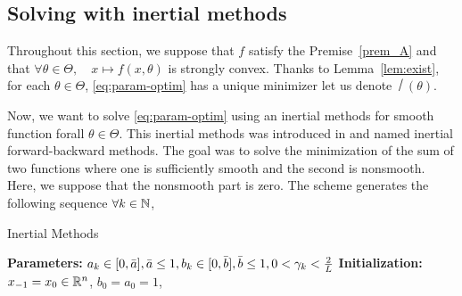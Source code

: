 \subsection{Solving with inertial methods}\label{subsec:solv-im}



Throughout this section, we suppose that $f$ satisfy the Premise~\ref{prem_A} and that $\forall \theta\in\Theta,\quad x\mapsto f(x,\theta)$ is strongly convex. Thanks to Lemma~\ref{lem:exist}, for each $\theta\in\Theta$, \eqref{eq:param-optim} has a unique minimizer let us denote $\xsol(\theta)$. 
 
 Now, we want to solve \eqref{eq:param-optim} using an  inertial  methods  for smooth function  forall $\theta\in\Theta.$  
 This inertial methods was introduced in \cite{liang_activity_2017} and named inertial forward-backward methods. The goal was to solve the minimization of the sum of two functions where one is sufficiently smooth and the second is nonsmooth. Here, we suppose that the nonsmooth part is zero.
 The scheme generates the following sequence $\forall k\in\mathbb{N}$,
 \begin{algorithm}[htbp]
	\caption{ Inertial Methods}
	\label{eq:inertial-methods}
	\textbf{Parameters:}  $a_{k}\in[0,\bar{a}], \bar{a}\leq1,  b_{k}\in[0,\bar{b}], \bar{b}\leq1,0<\gamma_{k}<\frac{2}{L}$\;
	\textbf{Initialization:} $x_{-1}=x_{0}\in\mathbb{R}^n$, $b_0=a_0=1$,  \;
\end{algorithm}
 
 
 
 
 

